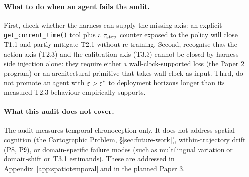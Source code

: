 \paragraph{What to do when an agent fails the audit.}
First, check whether the harness can supply the missing axis: an explicit \texttt{get\_current\_time()} tool plus a $\tau_{\mathrm{step}}$ counter exposed to the policy will close T1.1 and partly mitigate T2.1 without re-training. Second, recognise that the action axis (T2.3) and the calibration axis (T3.3) cannot be closed by harness-side injection alone: they require either a wall-clock-supported loss (the Paper 2 program) or an architectural primitive that takes wall-clock as input. Third, do not promote an agent with $\varepsilon > \varepsilon^{*}$ to deployment horizons longer than its measured T2.3 behaviour empirically supports.

\paragraph{What this audit does not cover.}
The audit measures temporal chronoception only. It does not address spatial cognition (the Cartographic Problem, \S\ref{sec:future-work}), within-trajectory drift (P8, P9), or domain-specific failure modes (such as multilingual variation or domain-shift on T3.1 estimands). These are addressed in Appendix~\ref{app:spatiotemporal} and in the planned Paper 3.
